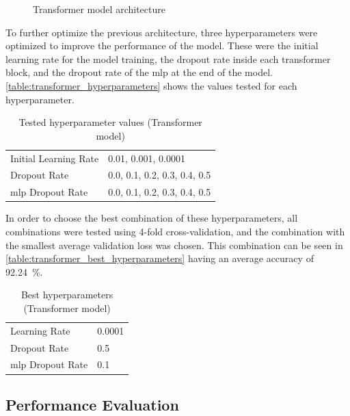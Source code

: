 \begin{figure}[ht]
    \centering
    {\fontsize{10}{12}\selectfont}
    \caption{Transformer model architecture}
    \label{fig:transformer_architecture}
\end{figure}

To further optimize the previous architecture, three hyperparameters were optimized to improve the performance of the model. These were the initial learning rate for the model training, the dropout rate inside each transformer block, and the dropout rate of the \acs{mlp} at the end of the model. \autoref{table:transformer_hyperparameters} shows the values tested for each hyperparameter.

\begin{table}[ht]
    \centering
    \caption{Tested hyperparameter values (Transformer model)}
    \label{table:transformer_hyperparameters}
    \begin{tabular}{ll}
        \toprule
        Initial Learning Rate & 0.01, 0.001, 0.0001 \\
        Dropout Rate & 0.0, 0.1, 0.2, 0.3, 0.4, 0.5 \\
        \acs{mlp} Dropout Rate & 0.0, 0.1, 0.2, 0.3, 0.4, 0.5 \\
        \bottomrule
    \end{tabular}
\end{table}

In order to choose the best combination of these hyperparameters, all combinations were tested using 4-fold cross-validation, and the combination with the smallest average validation loss was chosen. This combination can be seen in \autoref{table:transformer_best_hyperparameters} having an average accuracy of \SI{92.24}{\percent}.

\begin{table}[ht]
    \centering
    \caption{Best hyperparameters (Transformer model)}
    \label{table:transformer_best_hyperparameters}
    \begin{tabular}{ll}
        \toprule
        Learning Rate & 0.0001 \\
        Dropout Rate & 0.5 \\
        \acs{mlp} Dropout Rate & 0.1 \\
        \bottomrule
    \end{tabular}
\end{table}

\subsection{Performance Evaluation}

